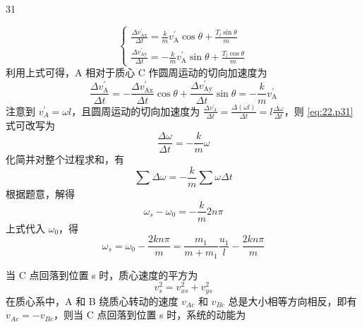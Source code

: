 \begin{solution}{31}
\begin{subsolution}
\begin{subproblem}[转动过程]
\begin{equation}
        \left\{
          \begin{array}{l}
            \frac{\Delta v_{\mathrm{Ax}}^{\prime}}{\Delta t} = \frac{k}{m} v_{\mathrm{A}}^{\prime} \cos \theta + \frac{T_{l} \sin \theta}{m} \\
            \frac{\Delta v_{\mathrm{Ay}}^{\prime}}{\Delta t} = - \frac{k}{m} v_{\mathrm{A}}^{\prime} \sin \theta + \frac{T_{l} \cos \theta}{m}
          \end{array}
        \right.
      \end{equation}
      利用上式可得，A 相对于质心 C 作圆周运动的切向加速度为
      \begin{equation}
        \frac{\Delta v_{\mathrm{A}}^{\prime}}{\Delta t} = - \frac{\Delta v_{\mathrm{Ax}}^{\prime}}{\Delta t} \cos \theta + \frac{\Delta v_{\mathrm{Ay}}^{\prime}}{\Delta t} \sin \theta = - \frac{k}{m} v_{\mathrm{A}}^{\prime}
        \label{eq:22.p31}
      \end{equation}
      注意到 $v_{A}^{\prime}=\omega l$，且圆周运动的切向加速度为 $\frac{\Delta v_{A}^{\prime}}{\Delta t}=\frac{\Delta(\omega l)}{\Delta t}=l\frac{\Delta\omega}{\Delta t}$，则 \eqref{eq:22.p31} 式可改写为
      \begin{equation}
        \frac{\Delta \omega}{\Delta t} = - \frac{k}{m} \omega
        \label{eq:23.p31}
      \end{equation}
      化简并对整个过程求和，有
      \begin{equation}
        \sum \Delta \omega = - \frac{k}{m} \sum \omega \Delta t
      \end{equation}
      根据题意，解得
      \begin{equation}
        \omega_{s} - \omega_{0} = - \frac{k}{m} 2 n \pi
        \label{eq:24.p31}
      \end{equation}
      上式代入 $\omega_0$，得
      \begin{equation}
        \omega_{s} = \omega_{0} - \frac{2 k n \pi}{m} = \frac{m_{1}}{m + m_{1}} \frac{u_{1}}{l} - \frac{2 k n \pi}{m}
        \label{eq:25.p31}
      \end{equation}
    \end{subproblem}
  \end{subsolution}
  \begin{subsolution}
    当 C 点回落到位置 s 时，质心速度的平方为
    \begin{equation}
      v_{s}^{2} = v_{x s}^{2} + v_{y s}^{2}
      \label{eq:26.p31}
    \end{equation}
    在质心系中，A 和 B 绕质心转动的速度 $v_{Ac}$ 和 $v_{Bc}$ 总是大小相等方向相反，即有 $v_{Ac} = -v_{Bc}$，则当 C 点回落到位置 s 时，系统的动能为

\end{subsolution}
\end{solution}
